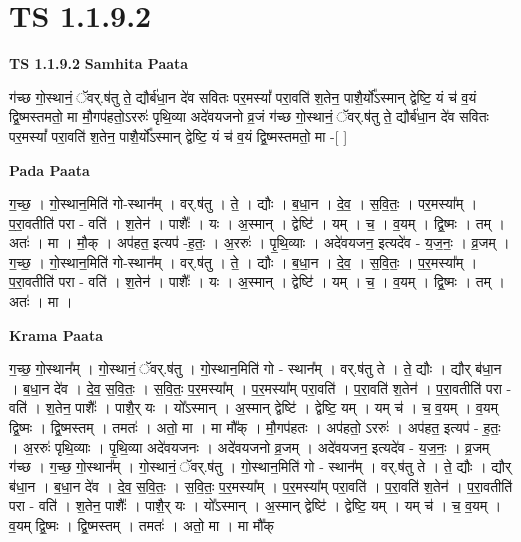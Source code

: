 \documentclass[17pt]{extarticle}
\begin{document}
\section{ TS 1.1.9.2 }

\textbf{TS 1.1.9.2 } \newline
\textbf{Samhita Paata} \newline

ग॑च्छ गो॒स्थानं॒ ॅवर्.ष॑तु ते॒ द्यौर्ब॑धा॒न दे॑व सवितः पर॒मस्यां᳚ परा॒वति॑ श॒तेन॒ पाशै॒र्यो᳚ऽस्मान् द्वेष्टि॒ यं च॑ व॒यं द्वि॒ष्मस्तमतो॒ मा मौ॒गप॑हतो॒ऽररुः॑ पृथि॒व्या अदे॑वयजनो व्र॒जं ग॑च्छ गो॒स्थानं॒ ॅवर्.ष॑तु ते॒ द्यौर्ब॑धा॒न दे॑व सवितः पर॒मस्यां᳚ परा॒वति॑ श॒तेन॒ पाशै॒र्यो᳚ऽस्मान् द्वेष्टि॒ यं च॑ व॒यं द्वि॒ष्मस्तमतो॒ मा -[ ] \newline

\textbf{Pada Paata} \newline

ग॒च्छ॒ । गो॒स्थान॒मिति॑ गो-स्थान᳚म् । वर्.ष॑तु । ते॒ । द्यौः । ब॒धा॒न । दे॒व॒ । स॒वि॒तः॒ । पर॒मस्या᳚म् । प॒रा॒वतीति॑ परा - वति॑ । श॒तेन॑ । पाशैः᳚ । यः । अ॒स्मान् । द्वेष्टि॑ । यम् । च॒ । व॒यम् । द्वि॒ष्मः । तम् । अतः॑ । मा । मौ॒क् । अप॑हत॒ इत्यप॑ -ह॒तः॒ । अ॒ररुः॑ । पृ॒थि॒व्याः । अदे॑वयजन॒ इत्यदे॑व - य॒ज॒नः॒ । व्र॒जम् । ग॒च्छ॒ । गो॒स्थान॒मिति॑ गो-स्थान᳚म् । वर्.ष॑तु । ते॒ । द्यौः । ब॒धा॒न । दे॒व॒ । स॒वि॒तः॒ । प॒र॒मस्या᳚म् । प॒रा॒वतीति॑ परा - वति॑ । श॒तेन॑ । पाशैः᳚ । यः । अ॒स्मान् । द्वेष्टि॑ । यम् । च॒ । व॒यम् । द्वि॒ष्मः । तम् । अतः॑ । मा ।  \newline


\textbf{Krama Paata} \newline

ग॒च्छ॒ गो॒स्थान᳚म् । गो॒स्थानं॒ ॅवर्.ष॑तु । गो॒स्थान॒मिति॑ गो - स्थान᳚म् । वर्.ष॑तु ते । ते॒ द्यौः । द्यौर् ब॑धा॒न । ब॒धा॒न दे॑व । दे॒व॒ स॒वि॒तः॒ । स॒वि॒तः॒ प॒र॒मस्या᳚म् । प॒र॒मस्या᳚म् परा॒वति॑ । प॒रा॒वति॑ श॒तेन॑ । प॒रा॒वतीति॑ परा - वति॑ । श॒तेन॒ पाशैः᳚ । पाशै॒र् यः । यो᳚ऽस्मान् । अ॒स्मान् द्वेष्टि॑ । द्वेष्टि॒ यम् । यम् च॑ । च॒ व॒यम् । व॒यम् द्वि॒ष्मः । द्वि॒ष्मस्तम् । तमतः॑ । अतो॒ मा । मा मौ᳚क् । मौ॒गप॑हतः । अप॑हतो॒ ऽररुः॑ । अप॑हत॒ इत्यप॑ - ह॒तः॒ । अ॒ररुः॑ पृथि॒व्याः । पृ॒थि॒व्या अदे॑वयजनः । अदे॑वयजनो व्र॒जम् । अदे॑वयजन॒ इत्यदे॑व - य॒ज॒नः॒ । व्र॒जम् ग॑च्छ । ग॒च्छ॒ गो॒स्थान᳚म् । गो॒स्थानं॒ ॅवर्.ष॑तु । गो॒स्थान॒मिति॑ गो - स्थान᳚म् । वर्.ष॑तु ते । ते॒ द्यौः । द्यौर् ब॑धा॒न । ब॒धा॒न दे॑व । दे॒व॒ स॒वि॒तः॒ । स॒वि॒तः॒ प॒र॒मस्या᳚म् । प॒र॒मस्या᳚म् परा॒वति॑ । प॒रा॒वति॑ श॒तेन॑ । प॒रा॒वतीति॑ परा - वति॑ । श॒तेन॒ पाशैः᳚ । पाशै॒र् यः । यो᳚ऽस्मान् । अ॒स्मान् द्वेष्टि॑ । द्वेष्टि॒ यम् । यम् च॑ । च॒ व॒यम् । व॒यम् द्वि॒ष्मः । द्वि॒ष्मस्तम् । तमतः॑ । अतो॒ मा । मा मौ᳚क् \newline
\end{document}

